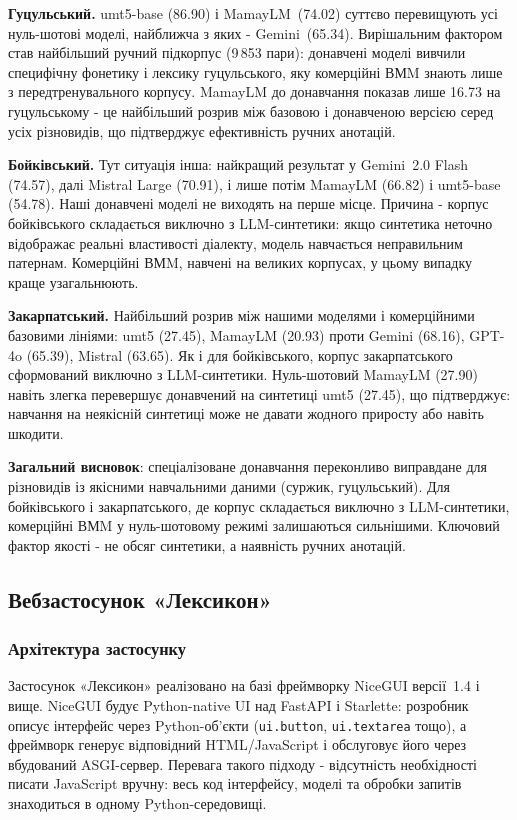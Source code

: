 \documentclass[14pt]{extarticle}
\begin{document}
\textbf{Гуцульський.} umt5-base (86.90) і MamayLM~(74.02) суттєво перевищують усі нуль-шотові моделі, найближча з яких - Gemini~(65.34). Вирішальним фактором став найбільший ручний підкорпус (9\,853 пари): донавчені моделі вивчили специфічну фонетику і лексику гуцульського, яку комерційні ВМM знають лише з передтренувального корпусу. MamayLM до донавчання показав лише 16.73 на гуцульському - це найбільший розрив між базовою і донавченою версією серед усіх різновидів, що підтверджує ефективність ручних анотацій.

\textbf{Бойківський.} Тут ситуація інша: найкращий результат у Gemini~2.0 Flash (74.57), далі Mistral Large (70.91), і лише потім MamayLM (66.82) і umt5-base (54.78). Наші донавчені моделі не виходять на перше місце. Причина - корпус бойківського складається виключно з LLM-синтетики: якщо синтетика неточно відображає реальні властивості діалекту, модель навчається неправильним патернам. Комерційні ВМM, навчені на великих корпусах, у цьому випадку краще узагальнюють.

\textbf{Закарпатський.} Найбільший розрив між нашими моделями і комерційними базовими лініями: umt5 (27.45), MamayLM (20.93) проти Gemini (68.16), GPT-4o (65.39), Mistral (63.65). Як і для бойківського, корпус закарпатського сформований виключно з LLM-синтетики. Нуль-шотовий MamayLM (27.90) навіть злегка перевершує донавчений на синтетиці umt5 (27.45), що підтверджує: навчання на неякісній синтетиці може не давати жодного приросту або навіть шкодити.

\textbf{Загальний висновок}: спеціалізоване донавчання переконливо виправдане для різновидів із якісними навчальними даними (суржик, гуцульський). Для бойківського і закарпатського, де корпус складається виключно з LLM-синтетики, комерційні ВМM у нуль-шотовому режимі залишаються сильнішими. Ключовий фактор якості - не обсяг синтетики, а наявність ручних анотацій.

\subsection{Вебзастосунок «Лексикон»}

\subsubsection{Архітектура застосунку}

Застосунок «Лексикон» реалізовано на базі фреймворку NiceGUI версії~1.4 і вище. NiceGUI будує Python-native UI над FastAPI і Starlette: розробник описує інтерфейс через Python-об'єкти (\texttt{ui.button}, \texttt{ui.textarea} тощо), а фреймворк генерує відповідний HTML/JavaScript і обслуговує його через вбудований ASGI-сервер. Перевага такого підходу - відсутність необхідності писати JavaScript вручну: весь код інтерфейсу, моделі та обробки запитів знаходиться в одному Python-середовищі.
\end{document}
